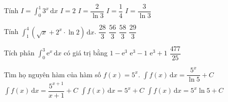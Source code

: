 

\begin{ex}%
	Tính $I=\displaystyle\int_0^1  3^x \mathrm{\,d}x$
	\choice 
		 {$I=2$}
		{\True$I=\dfrac{2}{\ln3}$} 
		{$I=\dfrac{1}{4}$} 
		 {$I=\dfrac{3}{\ln 3}$}
\end{ex}

\begin{ex}%
	Tính $\displaystyle\int_1^4\left(\sqrt{x}+2^x \cdot \ln 2\right)  \mathrm{\,d}x$.
	 \choice
		 {$\dfrac{28}{3}$}
		 {\True $\dfrac{56}{3}$}
		{$\dfrac{58}{3}$} 
		{$\dfrac{29}{3}$} 
\end{ex}

\begin{ex}%
	Tích phân $\displaystyle\int_0^3\mathrm{e}^x\mathrm{\,d}x$ có giá  trị bằng
	\choice 
		 {$1-\mathrm{e}^3$}
		 {\True $\mathrm{e}^3-1$}
		 {$\mathrm{e}^3+1$}
		{$\dfrac{477}{25}$} 
\end{ex}

\begin{ex}%
	Tìm họ nguyên hàm của  hàm số $f(x)=5^x$.
	\choice 
		{\True  $\displaystyle \int {f(x)}\mathrm{\,d}x=\dfrac{5^x}{\ln 5}+C$}
		 {$\displaystyle \int {f(x)}\mathrm{\,d}x=\dfrac{5^{x+1}}{x+1}+C$}
		{$\displaystyle  \int {f(x)}\mathrm{\,d}x=5^x+C$}
		{$\displaystyle \int {f(x)}\mathrm{\,d}x=5^x\ln 5+C$} 
\end{ex}

